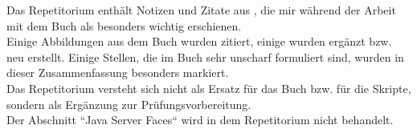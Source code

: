 \Hinweise

Das Repetitorium enthält Notizen und Zitate aus \cite[]{Oec22}, die mir während der Arbeit mit dem Buch als besonders wichtig erschienen.\\

\noindent
Einige Abbildungen aus dem Buch wurden zitiert, einige wurden ergänzt bzw. neu erstellt.
Einige Stellen, die im Buch sehr unscharf formuliert sind, wurden in dieser Zusammenfassung besonders markiert.\\

\noindent
Das Repetitorium versteht sich nicht als Ersatz für das Buch bzw. für die Skripte, sondern als Ergänzung zur Prüfungsvorbereitung.\\

\noindent
Der Abschnitt ``Java Server Faces`` wird in dem Repetitorium nicht behandelt.
